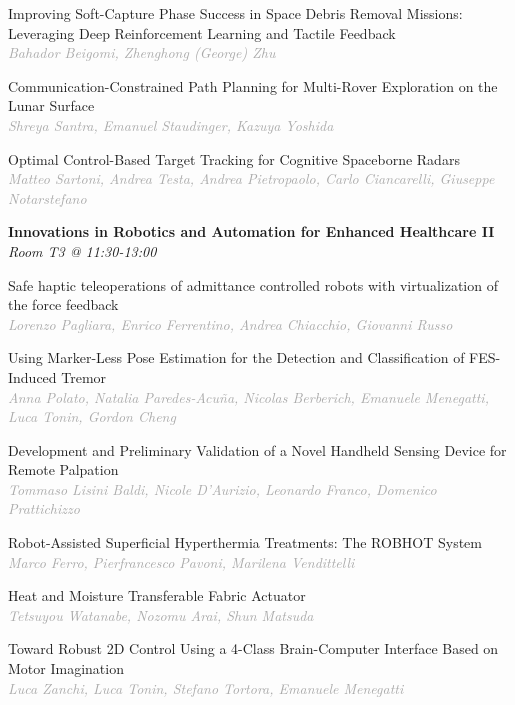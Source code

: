 \begin{multicols*}{2}
\small Improving Soft-Capture Phase Success in Space Debris Removal Missions: Leveraging Deep Reinforcement Learning and Tactile Feedback\\ 
\footnotesize \textcolor{darkgray}{\textit{Bahador Beigomi, Zhenghong (George)  Zhu}}

\small Communication-Constrained Path Planning for Multi-Rover Exploration on the Lunar Surface\\ 
\footnotesize \textcolor{darkgray}{\textit{Shreya Santra, Emanuel  Staudinger, Kazuya  Yoshida}}

\small Optimal Control-Based Target Tracking for Cognitive Spaceborne Radars\\ 
\footnotesize \textcolor{darkgray}{\textit{Matteo Sartoni, Andrea  Testa, Andrea  Pietropaolo, Carlo  Ciancarelli, Giuseppe  Notarstefano}}

\normalsize \textbf{Innovations in Robotics and Automation for Enhanced Healthcare II}\\
\small \textit{Room T3 @ 11:30-13:00}

\small Safe haptic teleoperations of admittance controlled robots with virtualization of the force feedback\\ 
\footnotesize \textcolor{darkgray}{\textit{Lorenzo Pagliara, Enrico  Ferrentino, Andrea  Chiacchio, Giovanni  Russo}}

\small Using Marker-Less Pose Estimation for the Detection and Classification of FES-Induced Tremor\\ 
\footnotesize \textcolor{darkgray}{\textit{Anna Polato, Natalia  Paredes-Acuña, Nicolas  Berberich, Emanuele  Menegatti, Luca  Tonin, Gordon  Cheng}}

\small Development and Preliminary Validation of a Novel Handheld Sensing Device for Remote Palpation\\ 
\footnotesize \textcolor{darkgray}{\textit{Tommaso Lisini Baldi, Nicole  D'Aurizio, Leonardo  Franco, Domenico  Prattichizzo}}

\small Robot-Assisted Superficial Hyperthermia Treatments: The ROBHOT System\\ 
\footnotesize \textcolor{darkgray}{\textit{Marco Ferro, Pierfrancesco  Pavoni, Marilena  Vendittelli}}

\small Heat and Moisture Transferable Fabric Actuator\\ 
\footnotesize \textcolor{darkgray}{\textit{Tetsuyou Watanabe, Nozomu  Arai, Shun  Matsuda}}

\small Toward Robust 2D Control Using a 4-Class Brain-Computer Interface Based on Motor Imagination\\ 
\footnotesize \textcolor{darkgray}{\textit{Luca Zanchi, Luca  Tonin, Stefano  Tortora, Emanuele  Menegatti}}


\end{multicols*}

